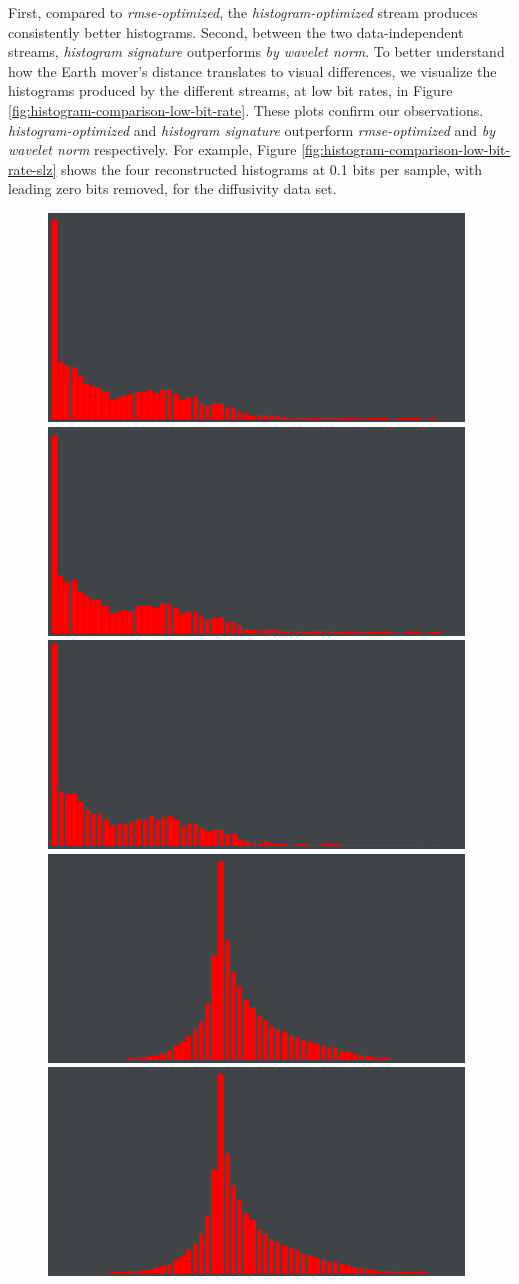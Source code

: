 First, compared to \emph{rmse-optimized}, the \emph{histogram-optimized} stream produces
consistently better histograms. Second, between the two data-independent streams, \emph{histogram
signature} outperforms \emph{by wavelet norm}. To better understand how the Earth mover's distance
translates to visual differences, we visualize the histograms produced by the different streams, at
low bit rates, in Figure \ref{fig:histogram-comparison-low-bit-rate}. These plots confirm our
observations.
\emph{histogram-optimized} and \emph{histogram signature}
outperform \emph{rmse-optimized} and \emph{by wavelet norm} respectively. For example, Figure
\ref{fig:histogram-comparison-low-bit-rate-slz} shows the four reconstructed histograms at 0.1 bits
per sample, with leading zero bits removed, for the diffusivity data set.

\begin{figure}[h]
	\centering
	{\includegraphics[width=0.32\linewidth]{img/histogram/histogram-renderings/histogram-boiler-by-wavelet-norm.png}}
	{\includegraphics[width=0.32\linewidth]{img/histogram/histogram-renderings/histogram-boiler-signature.png}}
	{\includegraphics[width=0.32\linewidth]{img/histogram/histogram-renderings/histogram-boiler-groundtruth.png}}
	{\includegraphics[width=0.32\linewidth]{img/histogram/histogram-renderings/histogram-diffusivity-by-wavelet-norm.png}}
	{\includegraphics[width=0.32\linewidth]{img/histogram/histogram-renderings/histogram-diffusivity-signature.png}}

\end{figure}
